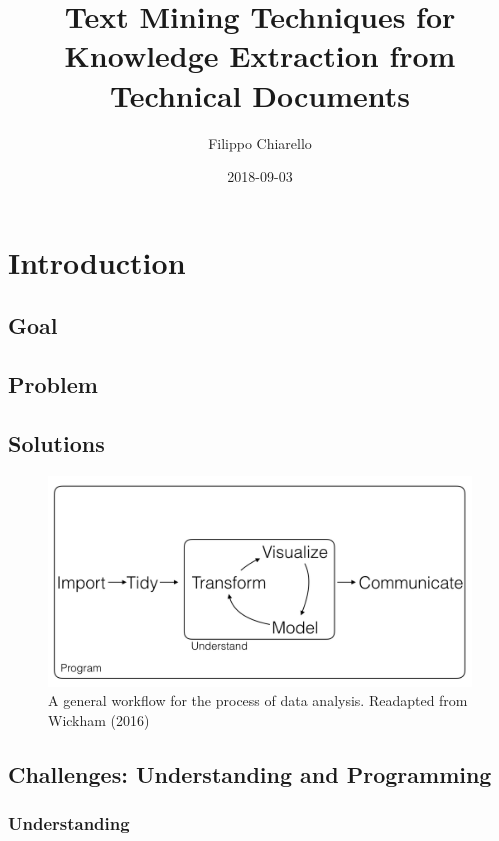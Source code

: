 \documentclass[]{book}
\title{Text Mining Techniques for Knowledge Extraction from Technical Documents}
\author{Filippo Chiarello}
\date{2018-09-03}
\theoremstyle{definition}
\theoremstyle{definition}
\theoremstyle{definition}
\theoremstyle{remark}
\begin{document}
\maketitle

{
\setcounter{tocdepth}{1}
\tableofcontents
}
\chapter{Introduction}\label{introduction}

\section{Goal}\label{goal}

\section{Problem}\label{problem}

\section{Solutions}\label{solutions}

\begin{figure}

{\centering \includegraphics[width=0.8\linewidth]{_bookdown_files/figures/main_work_flow} 

}

\caption{A general workflow for the process of data analysis. Readapted from Wickham (2016)}\label{fig:mainworkflow}
\end{figure}

\section{Challenges: Understanding and
Programming}\label{challenges-understanding-and-programming}

\subsection{Understanding}\label{understanding}
\end{document}
